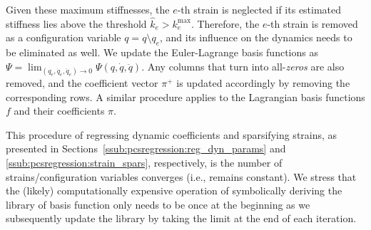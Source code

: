 Given these maximum stiffnesses, the $e$-th strain is neglected if its estimated stiffness lies above the threshold $\hat{k}_e>k_e^{\mathrm{max}}$. Therefore, the $e$-th strain is removed as a configuration variable $q = q\setminus q_e$, and its influence on the dynamics needs to be eliminated as well. We update the Euler-Lagrange basis functions as $\Psi = \lim_{(q_e,\dot{q}_e,\ddot{q}_e)\to 0} \Psi (q, \dot{q}, \ddot{q})$. Any columns that turn into all-\emph{zeros} are also removed, and the coefficient vector $\pi^+$ is updated accordingly by removing the corresponding rows. A similar procedure applies to the Lagrangian basis functions $f$ and their coefficients $\pi$.


This procedure of regressing dynamic coefficients and sparsifying strains, as presented in Sections~\ref{ssub:pcsregression:reg_dyn_params} and \ref{ssub:pcsregression:strain_spars}, respectively, is the number of strains/configuration variables converges (i.e., remains constant). We stress that the (likely) computationally expensive operation of symbolically deriving the library of basis function only needs to be once at the beginning as we subsequently update the library by taking the limit at the end of each iteration.

